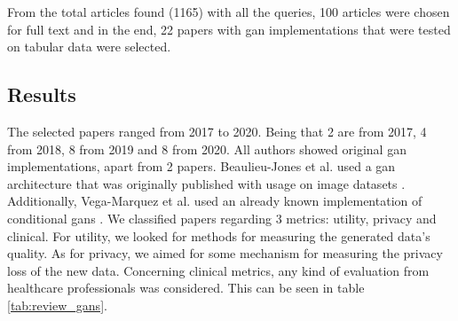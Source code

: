 From the total articles found (1165) with all the queries, 100 articles were chosen for full text and in the end, 22 papers with \ac{gan} implementations that were tested on tabular data were selected. 


\subsection{Results}
The selected papers ranged from 2017 to 2020. Being that 2 are from 2017, 4 from 2018, 8 from 2019 and 8 from 2020. All authors showed original \ac{gan} implementations, apart from 2 papers. Beaulieu-Jones et al. \cite{beaulieu-jones_privacy-preserving_2019} used a
\ac{gan} architecture that was originally published with usage on image datasets \cite{odena_conditional_2017}. Additionally, Vega-Marquez et al.  \cite{ISI:000490706700022} used an already known implementation of conditional \acp{gan} \cite{mirza_conditional_2014}. We classified papers regarding 3 metrics: utility, privacy and clinical. For utility, we looked for  methods for measuring the generated data's quality. As for privacy, we aimed for some mechanism for measuring the privacy loss of the new data. Concerning clinical metrics, any kind of evaluation from healthcare professionals was considered. This can be seen in table \ref{tab:review_gans}.


